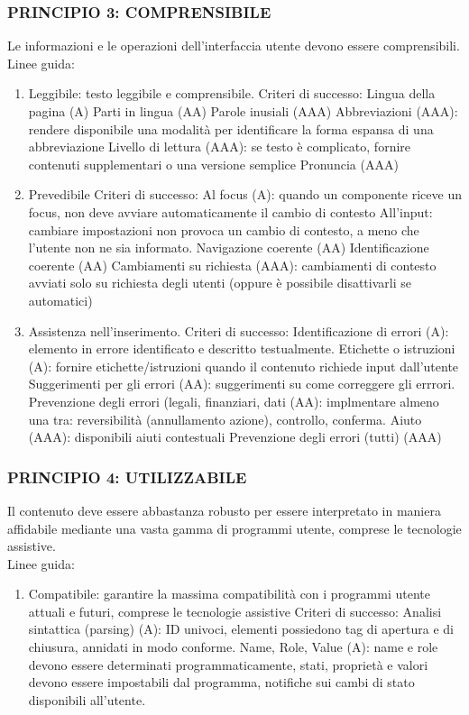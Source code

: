 \documentclass{article}
\begin{document}
\subsubsection{PRINCIPIO 3: COMPRENSIBILE} 
Le informazioni e le operazioni dell'interfaccia utente devono essere comprensibili.\\
Linee guida:
\begin{enumerate}
	\item Leggibile: testo leggibile e comprensibile.
	\subitem Criteri di successo:
	\subsubitem Lingua della pagina (A)
	\subsubitem Parti in lingua (AA)
	\subsubitem Parole inusiali (AAA)
	\subsubitem Abbreviazioni (AAA): rendere disponibile una modalità per identificare la forma espansa di una abbreviazione
	\subsubitem Livello di lettura (AAA): se testo è complicato, fornire contenuti supplementari o una versione semplice
	\subsubitem Pronuncia (AAA)
	\item Prevedibile
	\subitem Criteri di successo:
	\subsubitem Al focus (A): quando un componente riceve un focus, non deve avviare automaticamente il cambio di contesto
	\subsubitem All'input: cambiare impostazioni non provoca un cambio di contesto, a meno che l'utente non ne sia informato.
	\subsubitem Navigazione coerente (AA)
	\subsubitem Identificazione coerente (AA)
	\subsubitem Cambiamenti su richiesta (AAA): cambiamenti di contesto avviati solo su richiesta degli utenti (oppure è possibile disattivarli se automatici)
	\item Assistenza nell'inserimento.
	\subitem Criteri di successo:
	\subsubitem Identificazione di errori (A): elemento in errore identificato e descritto testualmente.
	\subsubitem Etichette o istruzioni (A): fornire etichette/istruzioni quando il contenuto richiede input dall'utente
	\subsubitem Suggerimenti per gli errori (AA): suggerimenti su come correggere gli errrori.
	\subsubitem Prevenzione degli errori (legali, finanziari, dati (AA): implmentare almeno una tra: reversibilità (annullamento azione), controllo, conferma.
	\subsubitem Aiuto (AAA): disponibili aiuti contestuali
	\subsubitem Prevenzione degli errori (tutti) (AAA)
\end{enumerate}
\subsubsection{PRINCIPIO 4: UTILIZZABILE}
Il contenuto deve essere abbastanza robusto per essere interpretato in maniera affidabile mediante una vasta gamma di programmi utente, comprese le tecnologie assistive.\\
Linee guida:
\begin{enumerate}
	\item Compatibile: garantire la massima compatibilità con i programmi utente attuali e futuri, comprese le tecnologie assistive
	\subitem Criteri di successo:
	\subsubitem Analisi sintattica (parsing) (A): ID univoci, elementi possiedono tag di apertura e di chiusura, annidati in modo conforme.
	\subsubitem Name, Role, Value (A): name e role devono essere determinati programmaticamente, stati, proprietà e valori devono essere impostabili dal programma, notifiche sui cambi di stato disponibili all'utente.
\end{enumerate}
\end{document}
